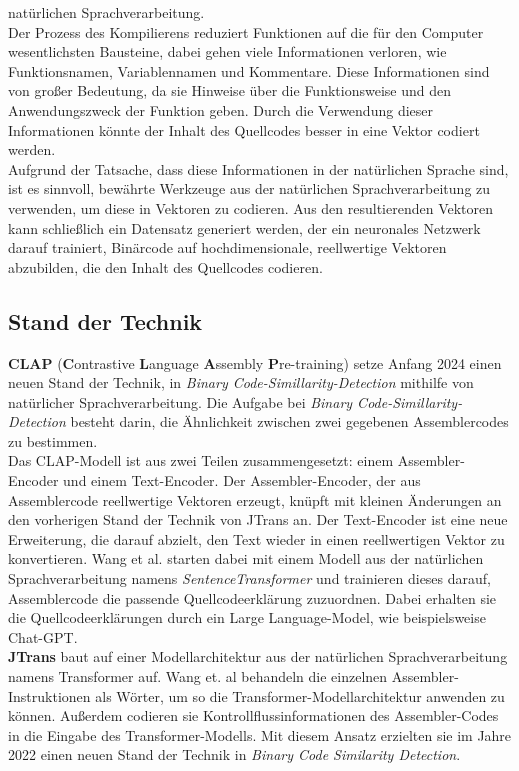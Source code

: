 \documentclass[12pt,letterpaper,ngerman]{article}
\begin{document}
natürlichen Sprachverarbeitung.\\
Der Prozess des Kompilierens reduziert Funktionen
auf die für den Computer wesentlichsten Bausteine, dabei gehen viele 
Informationen verloren, wie Funktionsnamen, Variablennamen und
Kommentare. Diese Informationen sind von großer Bedeutung, da
sie Hinweise über die Funktionsweise und den Anwendungszweck der
Funktion geben. Durch die Verwendung dieser Informationen 
könnte der Inhalt des Quellcodes besser in eine Vektor codiert
werden.\\
Aufgrund der Tatsache, dass diese Informationen in der natürlichen 
Sprache sind, ist es sinnvoll, bewährte Werkzeuge aus der natürlichen 
Sprachverarbeitung zu verwenden, um diese in Vektoren zu codieren. 
Aus den resultierenden Vektoren kann schließlich ein Datensatz
generiert werden, der ein neuronales Netzwerk darauf trainiert, 
Binärcode auf hochdimensionale, reellwertige Vektoren abzubilden,
die den Inhalt des Quellcodes codieren.
\pagebreak
\subsection{Stand der Technik}
{\bf CLAP} ({\bf C}ontrastive {\bf L}anguage {\bf A}ssembly {\bf P}re-training) 
\cite{clap} 
setze Anfang 2024 einen neuen Stand der Technik, in
\textit{Binary Code-Simillarity-Detection}
mithilfe von natürlicher Sprachverarbeitung. Die Aufgabe bei 
\textit{Binary Code-Simillarity-Detection}
besteht darin, die Ähnlichkeit zwischen zwei gegebenen 
Assemblercodes zu bestimmen.\\
Das CLAP-Modell ist aus zwei Teilen zusammengesetzt: einem Assembler-Encoder 
und einem Text-Encoder. Der Assembler-Encoder, der aus Assemblercode 
reellwertige Vektoren erzeugt, knüpft mit kleinen Änderungen an den vorherigen
Stand der Technik von JTrans an. Der Text-Encoder ist eine neue Erweiterung,
die darauf abzielt, den Text wieder in einen reellwertigen Vektor zu 
konvertieren. Wang et al. starten dabei mit einem Modell aus der natürlichen 
Sprachverarbeitung namens \textit{SentenceTransformer} und trainieren dieses
darauf, Assemblercode die passende Quellcodeerklärung  zuzuordnen. Dabei 
erhalten sie die Quellcodeerklärungen durch ein Large  Language-Model, wie
beispielsweise Chat-GPT.\\
{\bf JTrans} \cite{jtrans}
baut auf einer Modellarchitektur aus der natürlichen 
Sprachverarbeitung namens 
Transformer \cite{transformer} auf. 
Wang et. al behandeln die einzelnen Assembler-Instruktionen als Wörter, um so 
die Transformer-Modellarchitektur anwenden zu können. Außerdem codieren sie
Kontrollflussinformationen des Assembler-Codes in die Eingabe des 
Transformer-Modells. Mit diesem Ansatz erzielten sie im Jahre 2022 einen neuen
Stand der Technik in \textit{Binary Code Similarity Detection}.\\
\end{document}
